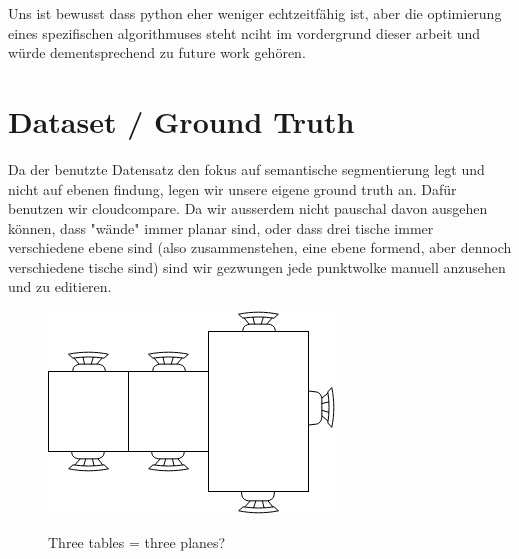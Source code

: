 \documentclass[main.tex]{subfiles}
\begin{document}
Uns ist bewusst dass python eher weniger echtzeitfähig ist, aber die optimierung eines spezifischen algorithmuses 
steht nciht im vordergrund dieser arbeit und würde dementsprechend zu future work gehören.

\section{Dataset / Ground Truth}
Da der benutzte Datensatz den fokus auf semantische segmentierung legt und nicht auf ebenen findung, 
legen wir unsere eigene ground truth an. Dafür benutzen wir cloudcompare. 
Da wir ausserdem nicht pauschal davon ausgehen können, dass "wände" immer planar sind, oder dass drei tische 
immer verschiedene ebene sind (also zusammenstehen, eine ebene formend, aber dennoch verschiedene tische sind) 
sind wir gezwungen jede punktwolke manuell anzusehen und zu editieren. 

\begin{figure} [!ht]
	\centering
	\includegraphics[width=10 cm]{images/tables.png}
	\label{fig:tables}
    \caption{Three tables = three planes?}
\end{figure}
\end{document}
